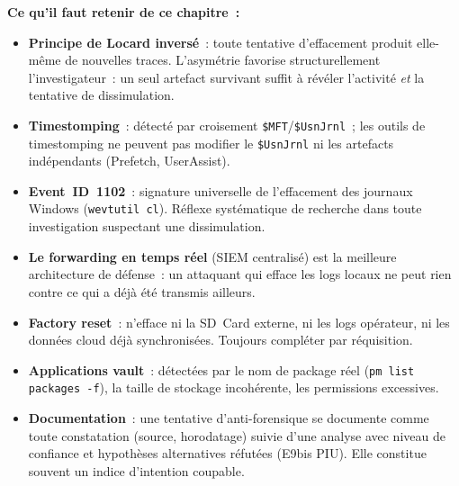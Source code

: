 \begin{boxresume}
\textbf{Ce qu'il faut retenir de ce chapitre~:}
\begin{itemize}
    \item \textbf{Principe de Locard inversé}~: toute tentative
          d'effacement produit elle-même de nouvelles traces.
          L'asymétrie favorise structurellement l'investigateur~:
          un seul artefact survivant suffit à révéler l'activité
          \emph{et} la tentative de dissimulation.

    \item \textbf{Timestomping}~: détecté par croisement
          \texttt{\$MFT}/\texttt{\$UsnJrnl}~; les outils de
          timestomping ne peuvent pas modifier le \texttt{\$UsnJrnl}
          ni les artefacts indépendants (Prefetch, UserAssist).

    \item \textbf{Event~ID~1102}~: signature universelle de
          l'effacement des journaux Windows (\texttt{wevtutil cl}).
          Réflexe systématique de recherche dans toute investigation
          suspectant une dissimulation.

    \item \textbf{Le forwarding en temps réel} (SIEM centralisé)
          est la meilleure architecture de défense~: un attaquant
          qui efface les logs locaux ne peut rien contre ce qui a
          déjà été transmis ailleurs.

    \item \textbf{Factory reset}~: n'efface ni la SD~Card externe,
          ni les logs opérateur, ni les données cloud déjà
          synchronisées. Toujours compléter par réquisition.

    \item \textbf{Applications vault}~: détectées par le nom de
          package réel (\texttt{pm list packages -f}), la taille
          de stockage incohérente, les permissions excessives.

    \item \textbf{Documentation}~: une tentative d'anti-forensique
          se documente comme toute constatation (source, horodatage)
          suivie d'une analyse avec niveau de confiance et
          hypothèses alternatives réfutées (E9bis PIU). Elle
          constitue souvent un indice d'intention coupable.
\end{itemize}
\end{boxresume}

\bigskip

